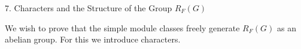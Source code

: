 7. Characters and the Structure of the Group $R_F(G)$

We wish to prove that the simple module classes freely generate $R_F(G)$ as an abelian group. For this we introduce characters.
